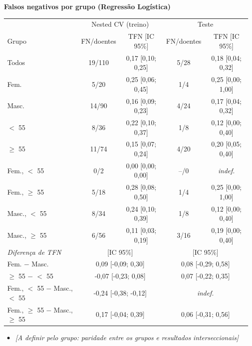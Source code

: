 \documentclass[10pt,a4paper]{article}
\newcommand{\pendente}[1]{{\color{pendente}\itshape[A definir pelo grupo: #1]}}
\newcommand{\nota}[1]{\par\vspace{1pt}{\scriptsize #1\par}\vspace{3pt}}
\begin{document}
\begin{paracol}{2}
\vspace{4pt}
{\footnotesize\bfseries Falsos negativos por grupo (Regressão Logística)}\par\vspace{1pt}
{\footnotesize \begin{tabular}{@{}l c c c c@{}}
\toprule
 & \multicolumn{2}{c}{Nested CV (treino)} & \multicolumn{2}{c}{Teste} \\
\cmidrule(lr){2-3}\cmidrule(l){4-5}
Grupo & FN/doentes & TFN [IC 95\%] & FN/doentes & TFN [IC 95\%] \\
\midrule
Todos & 19/110 & 0,17 [0,10; 0,25] & 5/28 & 0,18 [0,04; 0,32] \\
\addlinespace[1.5pt]
Fem. & 5/20 & 0,25 [0,06; 0,45] & 1/4 & 0,25 [0,00; 1,00] \\
Masc. & 14/90 & 0,16 [0,09; 0,23] & 4/24 & 0,17 [0,04; 0,32] \\
\addlinespace[1.5pt]
$<$ 55 & 8/36 & 0,22 [0,10; 0,37] & 1/8 & 0,12 [0,00; 0,40] \\
$\geq$ 55 & 11/74 & 0,15 [0,07; 0,24] & 4/20 & 0,20 [0,05; 0,40] \\
\addlinespace[1.5pt]
Fem., $<$ 55 & 0/2 & 0,00 [0,00; 0,00] & --/0 & \textit{indef.} \\
Fem., $\geq$ 55 & 5/18 & 0,28 [0,08; 0,50] & 1/4 & 0,25 [0,00; 1,00] \\
Masc., $<$ 55 & 8/34 & 0,24 [0,10; 0,39] & 1/8 & 0,12 [0,00; 0,40] \\
Masc., $\geq$ 55 & 6/56 & 0,11 [0,03; 0,19] & 3/16 & 0,19 [0,00; 0,40] \\
\midrule
\textit{Diferença de TFN} & \multicolumn{2}{c}{[IC 95\%]} & \multicolumn{2}{c}{[IC 95\%]} \\
Fem. $-$ Masc. & \multicolumn{2}{c}{0,09 [-0,09; 0,30]} & \multicolumn{2}{c}{0,08 [-0,29; 0,58]} \\
$\geq$ 55 $-$ $<$ 55 & \multicolumn{2}{c}{-0,07 [-0,23; 0,08]} & \multicolumn{2}{c}{0,07 [-0,22; 0,35]} \\
Fem., $<$ 55 $-$ Masc., $<$ 55 & \multicolumn{2}{c}{-0,24 [-0,38; -0,12]} & \multicolumn{2}{c}{\textit{indef.}} \\
Fem., $\geq$ 55 $-$ Masc., $\geq$ 55 & \multicolumn{2}{c}{0,17 [-0,04; 0,39]} & \multicolumn{2}{c}{0,06 [-0,31; 0,56]} \\
\bottomrule
\end{tabular}}
\nota{FN: pacientes com doença classificados como sem doença; TFN = FN/doentes. Diferença de TFN entre grupos do mesmo fator: 0 corresponde à Igualdade de Oportunidade; IC 95\% por bootstrap. indef.: grupo sem doentes.}
\begin{itemize}
\item \pendente{paridade entre os grupos e resultados interseccionais}
\end{itemize}


\end{paracol}
\end{document}
